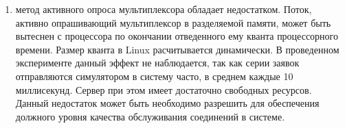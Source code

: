 \begin{enumerate}
\item метод активного опроса мультиплексора обладает недостатком. Поток, активно опрашивающий мультиплексор в разделяемой памяти, может быть вытеснен с процессора по окончании отведенного ему кванта процессорного времени. Размер кванта в Linux расчитывается динамически. В проведенном эксперименте данный эффект не наблюдается, так как серии заявок отправляются симулятором в систему часто, в среднем каждые 10 миллисекунд. Сервер при этом имеет достаточно свободных ресурсов. Данный недостаток может быть необходимо разрешить для обеспечения должного уровня качества обслуживания соединений в системе.
\end{enumerate}
